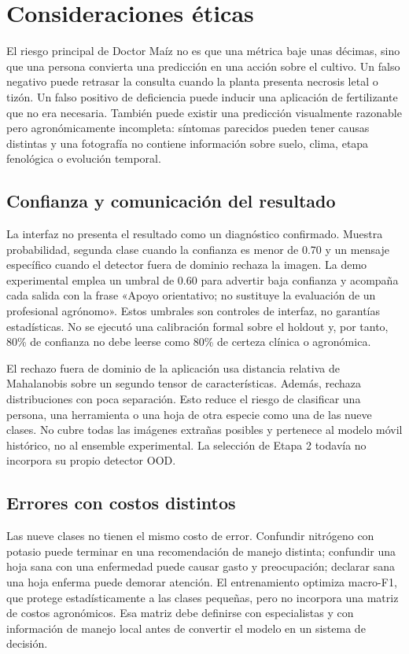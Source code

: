 \section{Consideraciones éticas}

El riesgo principal de Doctor Maíz no es que una métrica baje unas décimas,
sino que una persona convierta una predicción en una acción sobre el cultivo.
Un falso negativo puede retrasar la consulta cuando la planta presenta necrosis
letal o tizón. Un falso positivo de deficiencia puede inducir una aplicación de
fertilizante que no era necesaria. También puede existir una predicción
visualmente razonable pero agronómicamente incompleta: síntomas parecidos
pueden tener causas distintas y una fotografía no contiene información sobre
suelo, clima, etapa fenológica o evolución temporal.

\subsection{Confianza y comunicación del resultado}

La interfaz no presenta el resultado como un diagnóstico confirmado. Muestra
probabilidad, segunda clase cuando la confianza es menor de 0.70 y un mensaje
específico cuando el detector fuera de dominio rechaza la imagen. La demo
experimental emplea un umbral de 0.60 para advertir baja confianza y acompaña
cada salida con la frase «Apoyo orientativo; no sustituye la evaluación de un
profesional agrónomo». Estos umbrales son controles de interfaz, no garantías
estadísticas. No se ejecutó una calibración formal sobre el holdout y, por
tanto, 80\% de confianza no debe leerse como 80\% de certeza clínica o
agronómica.

El rechazo fuera de dominio de la aplicación usa distancia relativa de
Mahalanobis sobre un segundo tensor de características. Además, rechaza
distribuciones con poca separación. Esto reduce el riesgo de clasificar una
persona, una herramienta o una hoja de otra especie como una de las nueve
clases. No cubre todas las imágenes extrañas posibles y pertenece al modelo
móvil histórico, no al ensemble experimental. La selección de Etapa 2 todavía
no incorpora su propio detector OOD.

\subsection{Errores con costos distintos}

Las nueve clases no tienen el mismo costo de error. Confundir nitrógeno con
potasio puede terminar en una recomendación de manejo distinta; confundir una
hoja sana con una enfermedad puede causar gasto y preocupación; declarar sana
una hoja enferma puede demorar atención. El entrenamiento optimiza macro-F1,
que protege estadísticamente a las clases pequeñas, pero no incorpora una matriz
de costos agronómicos. Esa matriz debe definirse con especialistas y con
información de manejo local antes de convertir el modelo en un sistema de
decisión.

